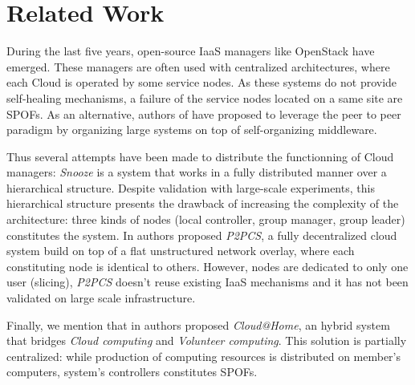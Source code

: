 \section{Related Work}
During the last five years, open-source IaaS managers like OpenStack have 
emerged. These managers are often used with centralized architectures, where 
each Cloud is operated by some service nodes. As these systems do not provide 
self-healing mechanisms, a failure of the service nodes located on a same site 
are SPOFs. As an alternative, authors of \cite{Babaoglu} have proposed to 
leverage the peer to peer paradigm by organizing large systems on top of 
self-organizing middleware.  

Thus several attempts have been made to distribute the functionning of Cloud 
managers: \emph{Snooze} \cite{feller:snooze2012} is 
a system that works in a fully distributed manner over a hierarchical 
structure. Despite validation with large-scale experiments, this hierarchical 
structure presents the drawback of increasing the complexity of the 
architecture: three kinds of nodes (local controller, group manager, group 
leader) constitutes the system. In \cite{babaoglu:design2012} authors proposed 
\emph{P2PCS}, a fully decentralized cloud system build on top of a flat 
unstructured network overlay, where each constituting node is identical to 
others. However, nodes are dedicated to only one user (slicing), \emph{P2PCS} 
doesn't reuse existing IaaS mechanisms and it has not been validated on large 
scale infrastructure.

Finally, we mention that in \cite{cunsolo:cloud2009} authors proposed 
\emph{Cloud@Home}, an hybrid system that bridges \emph{Cloud computing} and 
\emph{Volunteer computing}. This solution is partially centralized: while 
production of computing resources is distributed on member's computers, 
system's controllers constitutes SPOFs.